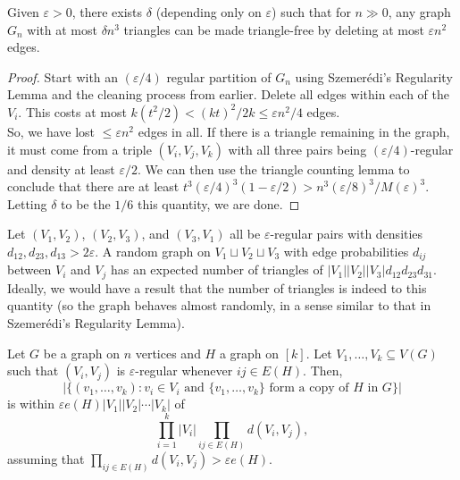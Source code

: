 			\begin{ftheo}
				\label{theo: triangle removal lemma}
				Given $\varepsilon>0$, there exists $\delta$ (depending only on $\varepsilon$) such that for $n\gg 0$, any graph $G_n$ with at most $\delta n^3$ triangles can be made triangle-free by deleting at most $\varepsilon n^2$ edges.
			\end{ftheo}
			\begin{proof}
				Start with an $(\varepsilon/4)$ regular partition of $G_n$ using Szemer\'{e}di's Regularity Lemma and the cleaning process from earlier. Delete all edges within each of the $V_i$. This costs at most $k (t^2/2) < (kt)^2/2k \le \varepsilon n^2/4$ edges.\\
				So, we have lost $\le \varepsilon n^2$ edges in all. If there is a triangle remaining in the graph, it must come from a triple $(V_i,V_j,V_k)$ with all three pairs being $(\varepsilon/4)$-regular and density at least $\varepsilon/2$. We can then use the triangle counting lemma to conclude that there are at least $t^3 (\varepsilon/4)^3 (1 - \varepsilon/2) > n^3 (\varepsilon/8)^3 / M(\varepsilon)^3$. Letting $\delta$ to be the $1/6$ this quantity, we are done.
			\end{proof}

			Let $(V_1,V_2)$, $(V_2,V_3)$, and $(V_3,V_1)$ all be $\varepsilon$-regular pairs with densities $d_{12}, d_{23}, d_{13}>2\varepsilon$. A random graph on $V_1\sqcup V_2\sqcup V_3$ with edge probabilities $d_{ij}$ between $V_i$ and $V_j$ has an expected number of triangles of $|V_1||V_2||V_3| d_{12}d_{23}d_{31}$.\\
			Ideally, we would have a result that the number of triangles is indeed to this quantity (so the graph behaves almost randomly, in a sense similar to that in Szemer\'{e}di's Regularity Lemma).

			\begin{ftheo}
				\label{theo: graph counting lemma}
				Let $G$ be a graph on $n$ vertices and $H$ a graph on $[k]$. Let $V_1,\ldots,V_k\subseteq V(G)$ such that $(V_i,V_j)$ is $\varepsilon$-regular whenever $ij\in E(H)$. Then,
				\[ \left|\{(v_1,\ldots,v_k) : v_i \in V_i \text{ and } \{v_1,\ldots,v_k\} \text{ form a copy of $H$ in $G$}\}\right| \]
				is within $\varepsilon e(H)|V_1||V_2|\cdots|V_k|$ of
				\[ \prod_{i=1}^k |V_i| \prod_{ij\in E(H)} d(V_i,V_j),  \]
				assuming that $\prod_{ij\in E(H)} d(V_i,V_j) > \varepsilon e(H)$.
			\end{ftheo}

